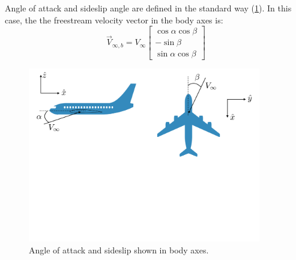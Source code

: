 \documentclass{article}
\begin{document}
Angle of attack and sideslip angle are defined in the standard way (\cref{fig:alphabeta2}).  In this case, the the freestream velocity vector in the body axes is: 
\begin{equation}
    \vec{V}_{\infty, b} = V_\infty
    \begin{bmatrix}
    \cos\alpha\cos\beta\\
    -\sin\beta\\
    \sin\alpha\cos\beta
    \end{bmatrix}
\end{equation}

\begin{figure}[htbp]
\centering
\includegraphics[width=4.0in]{figs/alphabeta2}
\caption{Angle of attack and sideslip shown in body axes.}
\label{fig:alphabeta2}
\end{figure}
\end{document}
